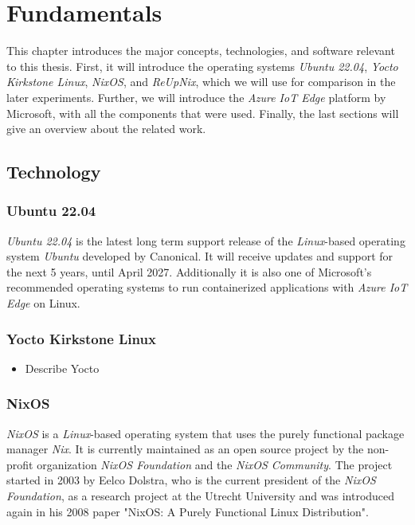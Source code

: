 \chapter{Fundamentals}
\label{sec:fundamentals}
This chapter introduces the major concepts, technologies,
and software relevant to this thesis. First, it will introduce the operating
systems \textit{Ubuntu 22.04}, \textit{Yocto Kirkstone Linux}, \textit{NixOS},
and \textit{ReUpNix}, which we will use for comparison in the later experiments.
Further, we will introduce the \textit{Azure IoT Edge} platform by Microsoft,
with all the components that were used.
Finally, the last sections will give an overview about the related work.

\section{Technology}
\subsection{Ubuntu 22.04}
\textit{Ubuntu 22.04} is the latest long term support release of the
\textit{Linux}-based operating system \textit{Ubuntu} developed by Canonical.
It will receive updates and support for the next 5 years, until April
2027\cite{ubuntu-releasenote}. Additionally it is also one of Microsoft's
recommended operating systems to run containerized applications with
\textit{Azure IoT Edge} on Linux\cite{msdoc-supportetplatforms}.

\subsection{Yocto Kirkstone Linux}
\begin{tcolorbox}[title=TODO]
    \begin{itemize}
        \item Describe Yocto
    \end{itemize}
\end{tcolorbox}

\subsection{NixOS}
\textit{NixOS} is a \textit{Linux}-based operating system that uses the purely
functional package manager \textit{Nix}. It is currently maintained as
an open source project by the non-profit organization \textit{NixOS Foundation}
and the \textit{NixOS Community}. The project started in 2003 by Eelco Dolstra,
who is the current president of the \textit{NixOS Foundation}, as
a research project at the Utrecht University\cite{dolstra2003} and was introduced again in his 2008
paper "NixOS: A Purely Functional Linux Distribution".

